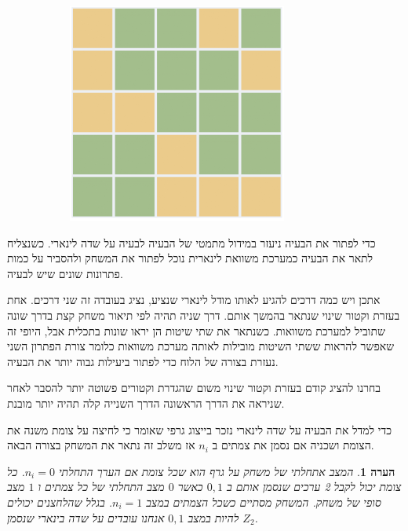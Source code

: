 \documentclass[12pt,twoside]{article}
\newtheorem{comm}{הערה}[section]
\begin{document}
\begin{figure}[ht]
\begin{subfigure}[b]{.25\linewidth}
    \end{subfigure}
    \begin{subfigure}[b]{.25\linewidth}
    \includegraphics[width=\linewidth]{images/5x5_sol.PNG}
    \end{subfigure}
\end{figure}

כדי לפתור את הבעיה ניעזר במידול מתמטי 
של הבעיה 
לבעיה על שדה לינארי.
כשנצליח לתאר את הבעיה כמערכת משוואת לינארית
נוכל לפתור את המשחק ולהסביר על כמות פתרונות שונים
שיש לבעיה.

אתכן ויש כמה דרכים להגיע לאותו מודל לינארי שנציע, נציג בעובדה זה שני דרכים.
אחת בעזרת וקטור שינוי שנתאר בהמשך אותם.
דרך שניה תהיה
לפי תיאור משחק קצת בדרך שונה שתוביל למערכת משוואות.
כשנתאר את שתי שיטות הן יראו שונות בתכלית אבל,
היופי זה שאפשר להראות ששתי השיטות מובילות לאותה מערכת משוואות
כלומר צורת הפתרון השני נעזרת בצורה של הלוח כדי לפתור ביעילות גבוה יותר את הבעיה.

בחרנו להציג קודם בעזרת וקטור שינוי משום שהגדרת וקטורים פשוטה יותר להסבר לאחר שניראה את הדרך הראשונה
הדרך השנייה קלה תהיה יותר מובנת.

כדי למדל את הבעיה על שדה לינארי נזכר בייצוג גרפי שאומר כי לחיצה על צומת משנה את הצומת ושכניה 
אם נסמן את צמתים ב
$n_i$
אז משלב זה נתאר את המשחק בצורה הבאה.
\begin{comm}
    \label{comm: describe the game from here on}
    המצב אתחלתי של משחק על גרף הוא שכל צומת אם הערך התחלתי
    $n_i = 0$.
    כל צומת יכול לקבל 2 ערכים שנסמן אותם ב
    ${0,1}$
    כאשר 
    $0$
    מצב התחלתי של כל צמתים  
    ו
    $1$
    מצב סופי של משחק.
    המשחק מסתיים כשכל הצמתים במצב
    $n_i = 1$.
    בגלל שהלחצנים יכולים להיות במצב 
    $0,1$
    אנחנו עובדים על שדה בינארי
    שנסמן
    $Z_2$.
\end{comm}
\end{document}
